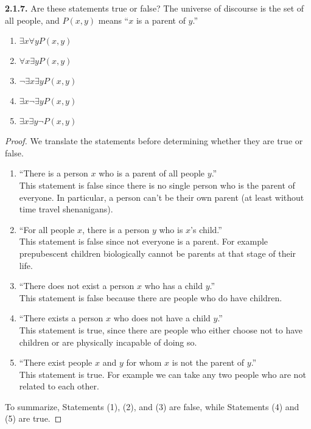 \documentclass[12pt]{amsart}
\newenvironment{statement}[1]{\smallskip\noindent\color[rgb]{.6627, .3529, .6314} {\bf #1.}}{}
\theoremstyle{definition}
\theoremstyle{remark}
\begin{document}
\begin{statement}{2.1.7}
Are these statements true or false?
The universe of discourse is the set of all people, and $P(x, y)$ means ``$x$ is a parent of $y$.''
\begin{enumerate}
	\item $\exists x \forall y P(x, y)$
	\item $\forall x \exists y P(x, y)$
	\item $\neg \exists x \exists y P(x, y)$
	\item $\exists x \neg \exists y P(x, y)$
	\item $\exists x \exists y \neg P(x, y)$
\end{enumerate}
\end{statement}

\begin{proof}
We translate the statements before determining whether they are true or false.
\begin{enumerate}
	\item ``There is a person $x$ who is a parent of all people $y$.'' \\
	This statement is false since there is no single person who is the parent of everyone.
	In particular, a person can't be their own parent (at least without time travel shenanigans).
	
	\item ``For all people $x$, there is a person $y$ who is $x$'s child.'' \\
	This statement is false since not everyone is a parent.
	For example prepubescent children biologically cannot be parents at that stage of their life.
	
	\item ``There does not exist a person $x$ who has a child $y$.'' \\
	This statement is false because there are people who do have children.
	
	\item ``There exists a person $x$ who does not have a child $y$.'' \\
	This statement is true, since there are people who either choose not to have children or are physically incapable of doing so.
	
	\item ``There exist people $x$ and $y$ for whom $x$ is not the parent of $y$.'' \\
	This statement is true.
	For example we can take any two people who are not related to each other.
\end{enumerate}
To summarize, Statements (1), (2), and (3) are false, while Statements (4) and (5) are true.
\end{proof}
\end{document}

